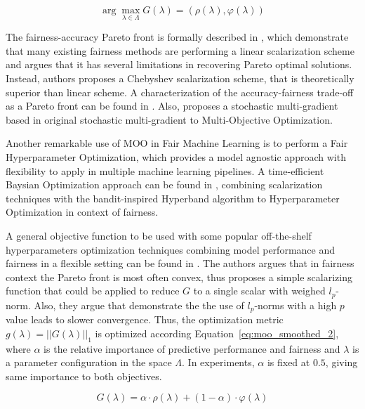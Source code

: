 \begin{equation}\label{def:scalarized_moo}
\arg\max\limits_{\lambda\in\Lambda} G(\lambda) = (\rho(\lambda), \varphi(\lambda))
\end{equation}

The fairness-accuracy Pareto front is formally described in \cite{Wei2022}, which demonstrate that many existing fairness methods are performing a linear scalarization scheme and argues that it has several limitations in recovering Pareto optimal solutions. Instead, authors proposes a Chebyshev scalarization scheme, that is theoretically superior than linear scheme. A characterization of the accuracy-fairness trade-off as a Pareto front can be found in \cite{Liu2022}. Also, \cite{Mercier2018} proposes a stochastic multi-gradient based in original stochastic multi-gradient to Multi-Objective Optimization.

Another remarkable use of MOO in Fair Machine Learning is to perform a Fair Hyperparameter Optimization, which provides a model agnostic approach with flexibility to apply in multiple machine learning pipelines. A time-efficient Baysian Optimization approach can be found in \cite{Schmucker2020}, combining scalarization techniques with the bandit-inspired Hyperband \citep{Li2016} algorithm to Hyperparameter Optimization in context of fairness.

A general objective function to be used with some popular off-the-shelf hyperparameters optimization techniques combining model performance and fairness in a flexible setting can be found in \cite{Cruz2021}. The authors argues that in fairness context the Pareto front is most often convex, thus proposes a simple scalarizing function that could be applied to reduce $G$ to a single scalar with weighed $l_p$-norm. Also, they argue that \cite{GIAGKIOZIS2015338} demonstrate the the  use  of $l_p$-norms with a high $p$ value leads to slower convergence. Thus, the optimization metric $g(\lambda) = ||G(\lambda)||_1$ is optimized according Equation~\ref{eq:moo_smoothed_2}, where $\alpha$ is the relative importance of predictive performance and fairness and $\lambda$ is a parameter configuration in the space $\Lambda$. In experiments, $\alpha$ is fixed at $0.5$, giving same importance to both objectives.

\begin{equation} \label{eq:moo_smoothed_2}
    G(\lambda) = \alpha \cdot \rho(\lambda) + (1-\alpha) \cdot \varphi(\lambda)
\end{equation}

